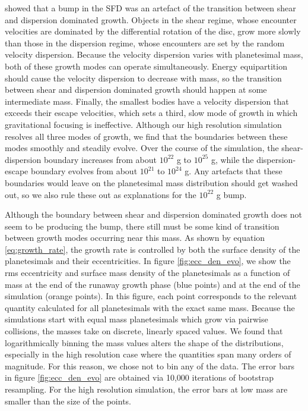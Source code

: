 \cite{weidenschilling11} showed that a bump in the SFD was an artefact of the transition between shear and dispersion dominated 
growth. Objects in the shear regime, whose encounter velocities are dominated by the differential rotation of the disc, grow more 
slowly than those in the dispersion regime, whose encounters are set by the random velocity dispersion. Because the velocity 
dispersion varies with planetesimal mass, both of these growth modes can operate simultaneously. Energy equipartition should 
cause the velocity dispersion to decrease with mass, so the transition between shear and dispersion dominated growth should 
happen at some intermediate mass. Finally, the smallest bodies have a velocity dispersion that exceeds their escape velocities, 
which sets a third, slow mode of growth in which gravitational focusing is ineffective. Although our high resolution simulation 
resolves all three modes of growth, we find that the boundaries between these modes smoothly and steadily evolve. Over the 
course of the simulation, the shear-dispersion boundary increases from about $10^{22}$ g to $10^{25}$ g, while the dispersion-
escape boundary evolves from about $10^{21}$ to $10^{24}$ g. Any artefacts that these boundaries would leave on the 
planetesimal mass distribution should get washed out, so we also rule these out as explanations for the $10^{22}$ g bump.

Although the boundary between shear and dispersion dominated growth does not seem to be producing the bump, there still 
must be some kind of transition between growth modes occurring near this mass. As shown by equation \ref{eq:growth_rate}, 
the growth rate is controlled by both the surface density of the planetesimals and their eccentricities. In figure 
\ref{fig:ecc_den_evo}, we show the rms eccentricity and surface mass density of the planetesimals as a function of mass at the 
end of the runaway growth phase (blue points) and at the end of the simulation (orange points). In this figure, each point 
corresponds to the relevant quantity calculated for all planetesimals with the exact same mass. Because the simulations start 
with equal mass planetesimals which grow via pairwise collisions, the masses take on discrete, linearly spaced values. We found 
that logarithmically binning the mass values alters the shape of the distributions, especially in the high resolution case where the 
quantities span many orders of magnitude. For this reason, we chose not to bin any of the data. The error bars in figure 
\ref{fig:ecc_den_evo} are obtained via 10,000 iterations of bootstrap resampling. For the high resolution simulation, the error 
bars at low mass are smaller than the size of the points.

